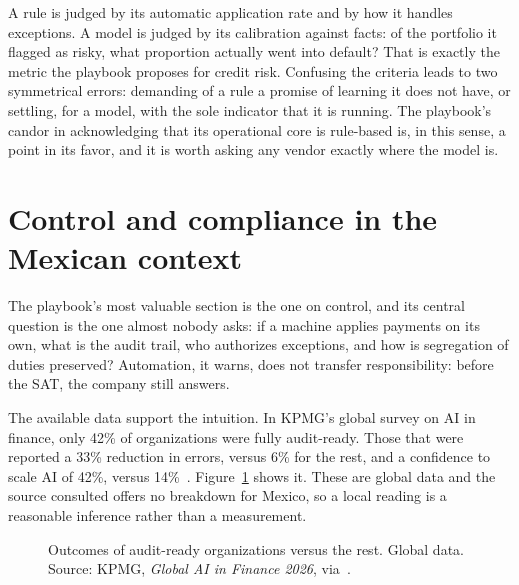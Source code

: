 \documentclass[11pt,a4paper]{article}
\begin{document}
A rule is judged by its automatic application rate and by how it handles exceptions. A model is judged by its calibration against facts: of the portfolio it flagged as risky, what proportion actually went into default? That is exactly the metric the playbook proposes for credit risk. Confusing the criteria leads to two symmetrical errors: demanding of a rule a promise of learning it does not have, or settling, for a model, with the sole indicator that it is running. The playbook's candor in acknowledging that its operational core is rule-based is, in this sense, a point in its favor, and it is worth asking any vendor exactly where the model is.

\section{Control and compliance in the Mexican context}

The playbook's most valuable section is the one on control, and its central question is the one almost nobody asks: if a machine applies payments on its own, what is the audit trail, who authorizes exceptions, and how is segregation of duties preserved? Automation, it warns, does not transfer responsibility: before the SAT, the company still answers.

The available data support the intuition. In KPMG's global survey on AI in finance, only 42\% of organizations were fully audit-ready. Those that were reported a 33\% reduction in errors, versus 6\% for the rest, and a confidence to scale AI of 42\%, versus 14\%~\cite{kpmgfin}. Figure~\ref{fig:ctrl} shows it. These are global data and the source consulted offers no breakdown for Mexico, so a local reading is a reasonable inference rather than a measurement.

\begin{figure}[h]
\centering
{}
\caption{Outcomes of audit-ready organizations versus the rest. Global data. Source: KPMG, \emph{Global AI in Finance 2026}, via~\cite{kpmgfin}.}
\label{fig:ctrl}
\end{figure}
\end{document}
